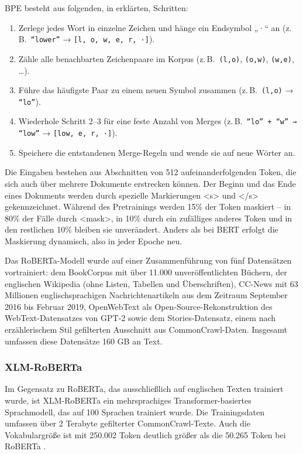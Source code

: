 BPE besteht aus folgenden, in \cite{sennrich2015} erklärten, Schritten:
\begin{enumerate}
  \item Zerlege jedes Wort in einzelne Zeichen und hänge ein Endsymbol „·“ an (z.\,B.\ \texttt{``lower''} → \texttt{[l, o, w, e, r, ·]}).
  \item Zähle alle benachbarten Zeichenpaare im Korpus (z.\,B.\ \texttt{(l,o)}, \texttt{(o,w)}, \texttt{(w,e)}, \dots).
  \item Führe das häufigste Paar zu einem neuen Symbol zusammen (z.\,B.\ \texttt{(l,o)} → \texttt{``lo''}).
  \item Wiederhole Schritt 2–3 für eine feste Anzahl von Merges (z.\,B.\ \texttt{``lo'' + ``w'' → ``low''} → \texttt{[low, e, r, ·]}).
  \item Speichere die entstandenen Merge-Regeln und wende sie auf neue Wörter an.
\end{enumerate}

Die Eingaben bestehen aus Abschnitten von 512 aufeinanderfolgenden Token, die sich auch über mehrere Dokumente erstrecken können. 
Der Beginn und das Ende eines Dokuments werden durch spezielle Markierungen <s> und </s> gekennzeichnet. 
Während des Pretrainings werden 15\% der Token maskiert – in 80\% der Fälle durch <mask>, in 10\% durch 
ein zufälliges anderes Token und in den restlichen 10\% bleiben sie unverändert. 
Anders als bei BERT erfolgt die Maskierung dynamisch, also in jeder Epoche neu.

Das RoBERTa-Modell wurde auf einer Zusammenführung von fünf Datensätzen vortrainiert: dem BookCorpus mit über 11.000 
unveröffentlichten Büchern, der englischen Wikipedia (ohne Listen, Tabellen und Überschriften), 
CC-News mit 63 Millionen englischsprachigen Nachrichtenartikeln aus dem Zeitraum September 2016 bis Februar 2019, 
OpenWebText als Open-Source-Rekonstruktion des WebText-Datensatzes von GPT-2 sowie dem Stories-Datensatz, 
einem nach erzählerischem Stil gefilterten Ausschnitt aus CommonCrawl-Daten. Insgesamt umfassen diese Datensätze 160 GB an Text.

\subsubsection{XLM-RoBERTa} \label{sec04:xml_roberta}

Im Gegensatz zu RoBERTa, das ausschließlich auf englischen Texten trainiert wurde, ist XLM-RoBERTa ein mehrsprachiges 
Transformer-basiertes Sprachmodell, das auf 100 Sprachen trainiert wurde. 
Die Trainingsdaten umfassen über 2 Terabyte gefilterter CommonCrawl-Texte.
Auch die Vokabulargröße ist mit 250.002 Token deutlich größer als die 50.265 Token bei RoBERTa \cite{DBLP:journals/corr/abs-1911-02116}.

